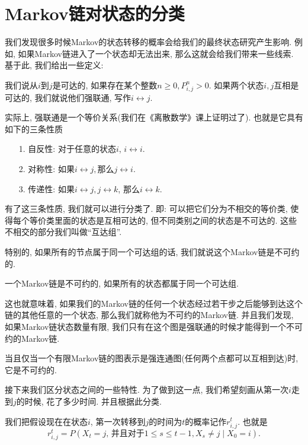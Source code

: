 \section{Markov链对状态的分类}

我们发现很多时候Markov的状态转移的概率会给我们的最终状态研究产生影响. 例如, 如果Markov链进入了一个状态却无法出来, 那么这就会给我们带来一些线索. 基于此, 我们给出一些定义: 

\begin{definition}
    我们说从$i$到$j$是可达的, 如果存在某个整数$n\geq 0,P_{i,j}^n>0$. 如果两个状态$i,j$互相是可达的, 我们就说他们强联通, 写作$i \leftrightarrow j$. 
\end{definition}

实际上, 强联通是一个等价关系(我们在《离散数学》课上证明过了). 也就是它具有如下的三条性质
\begin{itemize}
    \item [1.] 自反性: 对于任意的状态$i$, $i\leftrightarrow i$.
    \item [2.] 对称性: 如果$i\leftrightarrow j, $那么$j\leftrightarrow i$.
    \item [3.] 传递性: 如果$i\leftrightarrow j, j\leftrightarrow k$, 那么$i\leftrightarrow k$. 
\end{itemize}

有了这三条性质, 我们就可以进行分类了. 即: 可以把它们分为不相交的等价类, 使得每个等价类里面的状态是互相可达的, 但不同类别之间的状态是不可达的. 这些不相交的部分我们叫做``互达组''. 

特别的, 如果所有的节点属于同一个可达组的话, 我们就说这个Markov链是不可约的. 

\begin{definition}
    一个Markov链是不可约的, 如果所有的状态都属于同一个可达组. 
\end{definition}

这也就意味着, 如果我们的Markov链的任何一个状态经过若干步之后能够到达这个链的其他任意的一个状态, 那么我们就称他为不可约的Markov链. 并且我们发现, 如果Markov链状态数量有限, 我们只有在这个图是强联通的时候才能得到一个不可约的Markov链. 

\begin{lemma}
    当且仅当一个有限Markov链的图表示是强连通图(任何两个点都可以互相到达)时, 它是不可约的. 
\end{lemma}

接下来我们区分状态之间的一些特性. 为了做到这一点, 我们希望刻画从第一次$i$走到$j$的时候, 花了多少时间. 并且根据此分类. 

\begin{definition}
    我们把假设现在在状态$i$, 第一次转移到$j$的时间为$t$的概率记作$r_{i, j}^t$. 也就是
    $$
    r_{i, j}^t=P\left(X_t=j \text{, 并且对于} 1 \leq s \leq t-1, X_s \neq j \mid X_0=i\right).
    $$
\end{definition}

